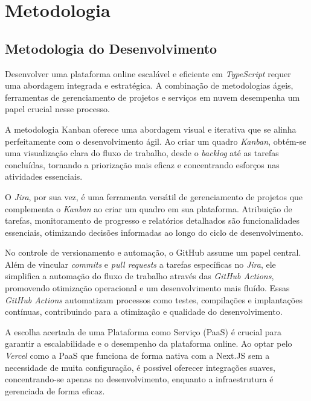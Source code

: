 \part{Metodologia}
\chapter{Metodologia do Desenvolvimento}
Desenvolver uma plataforma online escalável e eficiente em \textit{TypeScript} requer uma abordagem integrada e estratégica. A combinação de metodologias ágeis, ferramentas de gerenciamento de projetos e serviços em nuvem desempenha um papel crucial nesse processo.

A metodologia Kanban oferece uma abordagem visual e iterativa que se alinha perfeitamente com o desenvolvimento ágil. Ao criar um quadro \textit{Kanban}, obtém-se uma visualização clara do fluxo de trabalho, desde o \textit{backlog} até as tarefas concluídas, tornando a priorização mais eficaz e concentrando esforços nas atividades essenciais.

O \textit{Jira}, por sua vez, é uma ferramenta versátil de gerenciamento de projetos que complementa o \textit{Kanban} ao criar um quadro em sua plataforma. Atribuição de tarefas, monitoramento de progresso e relatórios detalhados são funcionalidades essenciais, otimizando decisões informadas ao longo do ciclo de desenvolvimento.

No controle de versionamento e automação, o GitHub assume um papel central. Além de vincular \textit{commits} e \textit{pull requests} a tarefas específicas no \textit{Jira}, ele simplifica a automação do fluxo de trabalho através das \textit{GitHub Actions}, promovendo otimização operacional e um desenvolvimento mais fluído. Essas \textit{GitHub Actions} automatizam processos como testes, compilações e implantações contínuas, contribuindo para a otimização e qualidade do desenvolvimento.

A escolha acertada de uma Plataforma como Serviço (PaaS) é crucial para garantir a escalabilidade e o desempenho da plataforma online. Ao optar pelo \textit{Vercel} como a PaaS que funciona de forma nativa com a Next.JS sem a necessidade de muita configuração, é possível oferecer integrações suaves, concentrando-se apenas no desenvolvimento, enquanto a infraestrutura é gerenciada de forma eficaz.

